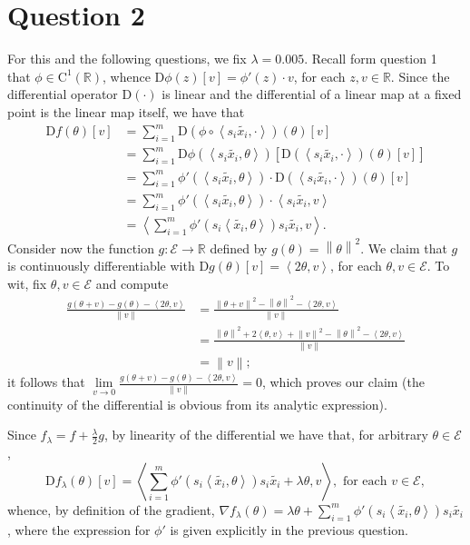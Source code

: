 \documentclass{article}
\theoremstyle{definition}
\theoremstyle{remark}
\newcommand{\R}{\mathbb{R}}
\newcommand \norm[1]{\left\lVert #1 \right\rVert}
\newcommand\inn [2]{\left\langle #1{,}#2\right\rangle}
\newcommand{\D}{\mathrm D}
\begin{document}
\section*{Question 2}
For this and the following questions, we  fix $\lambda=0.005$.
Recall form question 1 that $\phi\in \mathrm C^1(\R)$, whence $\D \phi (z)[v]=\phi'(z)\cdot v$, for each $z,v\in \R$.
Since the differential operator $\D(\cdot)$ is linear and the differential of a linear map at a fixed point is the linear map itself, we have that
\begin{align*}
  \D f(\theta)[v] &= \sum_{i=1}^m  \D \left( \phi\circ \inn{s_i\tilde{x_i}}{\cdot} \right)(\theta)[v]\\
  &= \sum_{i=1}^m  \D \phi(\inn{s_i\tilde{x_i}}{\theta}) 
\left[ \D (\inn{s_i\tilde{x_i}}{\cdot})(\theta)[v] \right]\\
&= \sum_{i=1}^m   \phi'(\inn{s_i\tilde{x_i}}{\theta}) \cdot
 \D (\inn{s_i\tilde{x_i}}{\cdot})(\theta)[v] \\
&=  \sum_{i=1}^m   \phi'(\inn{s_i\tilde{x_i}}{\theta}) \cdot
  \inn{s_i\tilde{x_i}}{v}\\
  &=\inn{\sum_{i=1}^m  \phi'(s_i\inn{\tilde{x_i}}{\theta})s_i\tilde{x_i}}{v}.
\end{align*}
Consider now the function $g\colon \mathcal E\to \R$ defined by $g(\theta)=\norm \theta^2$. We claim that $g$ is continuously differentiable with $\D g(\theta)[v]=\inn {2\theta}{v}$, for each $\theta,v\in \mathcal E$. To wit, fix  $\theta,v\in \mathcal E$ and compute
\begin{align*}
\frac{g(\theta+v)-g(\theta)-\inn{2\theta}{v}}{\norm v} &= \frac{\norm{\theta+v}^2-\norm{\theta}^2-\inn{2\theta}{v}}{\norm v}\\
&=\frac{\norm \theta^2 +2\inn {\theta}{v}+\norm v^2-\norm \theta^2-\inn{2\theta}{v}}{\norm v}\\
&=\norm v;
\end{align*}
it follows that $\lim\limits_{v\to 0}\frac{g(\theta+v)-g(\theta)-\inn{2\theta}{v}}{\norm v}=0$, which proves our claim (the continuity of the differential is obvious from its analytic expression).

Since $f_\lambda=f+\frac \lambda 2 g$, by linearity of the differential we have that, for arbitrary $\theta\in \mathcal E$,
$$
\D f_\lambda(\theta)[v]=\inn{\sum_{i=1}^m   \phi'(s_i\inn{\tilde{x_i}}{\theta})s_i\tilde{x_i}+\lambda\theta}{v}, \text{ for each }v\in \mathcal E,
$$
whence, by definition of the gradient, $\nabla f_\lambda(\theta)=\lambda\theta+\sum_{i=1}^m   \phi'(s_i\inn{\tilde{x_i}}{\theta})s_i\tilde{x_i}$, where the expression for $\phi'$ is given explicitly in the previous question.
\end{document}
